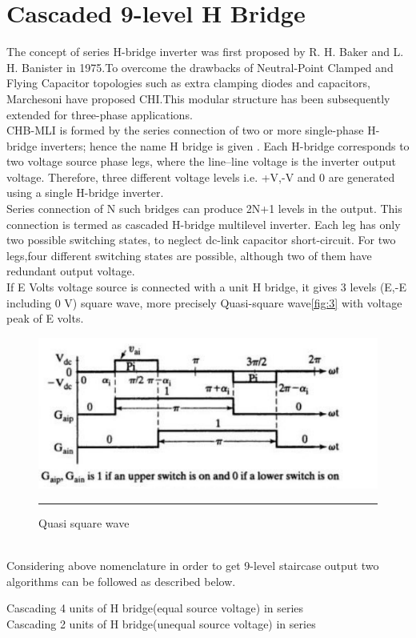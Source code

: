 \section{Cascaded 9-level H Bridge}
The concept of series H-bridge inverter was first proposed by R. H. Baker and L. H. Banister in 1975.To overcome the drawbacks of Neutral-Point Clamped and Flying Capacitor topologies such as extra clamping diodes and capacitors, Marchesoni have proposed CHI.This modular structure has been subsequently extended for three-phase applications.\\
CHB-MLI is formed by the series connection of two or
more single-phase H-bridge inverters; hence the name H bridge is given . Each H-bridge corresponds to two
voltage source phase legs, where the line–line voltage is
the inverter output voltage. Therefore, three different
voltage levels i.e. +V,-V and 0 are generated using a single H-bridge
inverter.\\
 Series connection of N such bridges can produce 2N+1 levels in the output. This connection is termed as cascaded H-bridge multilevel inverter.
Each leg has only two possible switching states, to neglect
dc-link capacitor short-circuit. For two legs,four different switching states are possible, although two of them have redundant output voltage.\\
If E Volts voltage source is connected with a unit H bridge, it gives 3 levels (E,-E including 0 V) square wave, more precisely Quasi-square wave\ref{fig:3} with voltage peak of E volts.\\
\begin{figure}[htbp]
	\centering
		\includegraphics[width = 5in]{./Figures/quasi2.pdf}
		\rule{35em}{5pt}
	\caption{Quasi square wave}
	\label{fig:6}
\end{figure}\\

Considering above nomenclature in order to get 9-level staircase output two algorithms can be followed as described below.
\begin{description}
\item [Cascading 4 units of H bridge(equal source voltage) in series]
\item [Cascading 2 units of H bridge(unequal source voltage) in series]
\end{description}
